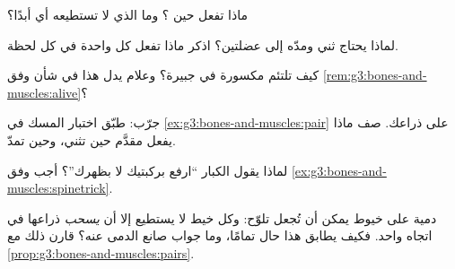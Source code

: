 \begin{exercise}[$\star$]\label{exo:g3:bones-and-muscles:5}
ماذا تفعل  حين ؟ وما الذي لا تستطيعه أي  أبدًا؟
\end{exercise}

\begin{exercise}[$\star$]\label{exo:g3:bones-and-muscles:6}
لماذا يحتاج ثني  ومدّه إلى عضلتين؟ اذكر ماذا تفعل كل واحدة
في كل لحظة.
\end{exercise}

\begin{exercise}[$\star$]\label{exo:g3:bones-and-muscles:7}
كيف تلتئم  مكسورة في جبيرة؟ وعلام يدل هذا في شأن  وفق
\cref{rem:g3:bones-and-muscles:alive}؟
\end{exercise}

\begin{exercise}[$\star$]\label{exo:g3:bones-and-muscles:8}
جرّب: طبّق اختبار المسك في \cref{ex:g3:bones-and-muscles:pair}
على ذراعك. صف ماذا يفعل مقدَّم  حين تثني، وحين تمدّ.
\end{exercise}

\begin{exercise}[$\star\star$]\label{exo:g3:bones-and-muscles:9}
لماذا يقول الكبار ``ارفع بركبتيك لا بظهرك''؟ أجب وفق
\cref{ex:g3:bones-and-muscles:spinetrick}.
\end{exercise}

\begin{exercise}[$\star\star$]\label{exo:g3:bones-and-muscles:10}
دمية على خيوط يمكن أن تُجعل تلوّح: وكل خيط لا يستطيع إلا أن
\emph{يسحب} ذراعها في اتجاه واحد. فكيف يطابق هذا حال 
تمامًا، وما جواب صانع الدمى عنه؟ قارن ذلك
مع \cref{prop:g3:bones-and-muscles:pairs}.
\end{exercise}
